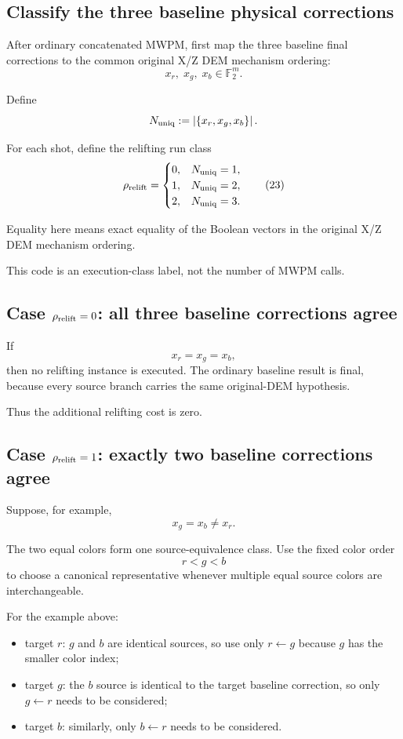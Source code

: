 \documentclass[11pt]{article}
\newcommand{\F}{\mathbb{F}_2}
\begin{document}
\subsection{Classify the three baseline physical corrections}

After ordinary concatenated MWPM, first map the three baseline final corrections
to the common original X/Z DEM mechanism ordering:
\[
    x_r,\;x_g,\;x_b\in\F^m.
\]

Define
\[
    N_{\rm uniq}
    :=
    \left|\{x_r,x_g,x_b\}\right|.
\]

For each shot, define the relifting run class
\[
    \rho_{\rm relift}
    =
    \begin{cases}
        0,&N_{\rm uniq}=1,\\
        1,&N_{\rm uniq}=2,\\
        2,&N_{\rm uniq}=3.
    \end{cases}
    \tag{23}
\]

Equality here means exact equality of the Boolean vectors in the original X/Z
DEM mechanism ordering.

This code is an execution-class label, not the number of MWPM calls.

\subsection{Case $\rho_{\rm relift}=0$: all three baseline corrections agree}

If
\[
    x_r=x_g=x_b,
\]
then no relifting instance is executed.  The ordinary baseline result is final,
because every source branch carries the same original-DEM hypothesis.

Thus the additional relifting cost is zero.

\subsection{Case $\rho_{\rm relift}=1$: exactly two baseline corrections agree}

Suppose, for example,
\[
    x_g=x_b\neq x_r.
\]

The two equal colors form one source-equivalence class.  Use the fixed color
order
\[
    r<g<b
\]
to choose a canonical representative whenever multiple equal source colors are
interchangeable.

For the example above:
\begin{itemize}
    \item target $r$: $g$ and $b$ are identical sources, so use only
    $r\leftarrow g$ because $g$ has the smaller color index;
    \item target $g$: the $b$ source is identical to the target baseline
    correction, so only $g\leftarrow r$ needs to be considered;
    \item target $b$: similarly, only $b\leftarrow r$ needs to be considered.
\end{itemize}
\end{document}

